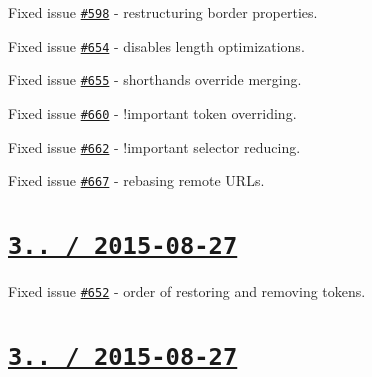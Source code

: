 \begin{DoxyItemize}
\item Fixed issue \href{https://github.com/jakubpawlowicz/clean-css/issues/598}{\tt \#598} -\/ restructuring border properties.
\item Fixed issue \href{https://github.com/jakubpawlowicz/clean-css/issues/654}{\tt \#654} -\/ disables length optimizations.
\item Fixed issue \href{https://github.com/jakubpawlowicz/clean-css/issues/655}{\tt \#655} -\/ shorthands override merging.
\item Fixed issue \href{https://github.com/jakubpawlowicz/clean-css/issues/660}{\tt \#660} -\/ !important token overriding.
\item Fixed issue \href{https://github.com/jakubpawlowicz/clean-css/issues/662}{\tt \#662} -\/ !important selector reducing.
\item Fixed issue \href{https://github.com/jakubpawlowicz/clean-css/issues/667}{\tt \#667} -\/ rebasing remote U\+R\+Ls.
\end{DoxyItemize}

\section*{\href{https://github.com/jakubpawlowicz/clean-css/compare/v3.4.0...v3.4.1}{\tt 3.. / 2015-\/08-\/27} }


\begin{DoxyItemize}
\item Fixed issue \href{https://github.com/jakubpawlowicz/clean-css/issues/652}{\tt \#652} -\/ order of restoring and removing tokens.
\end{DoxyItemize}

\section*{\href{https://github.com/jakubpawlowicz/clean-css/compare/v3.3.10...v3.4.0}{\tt 3.. / 2015-\/08-\/27} }


